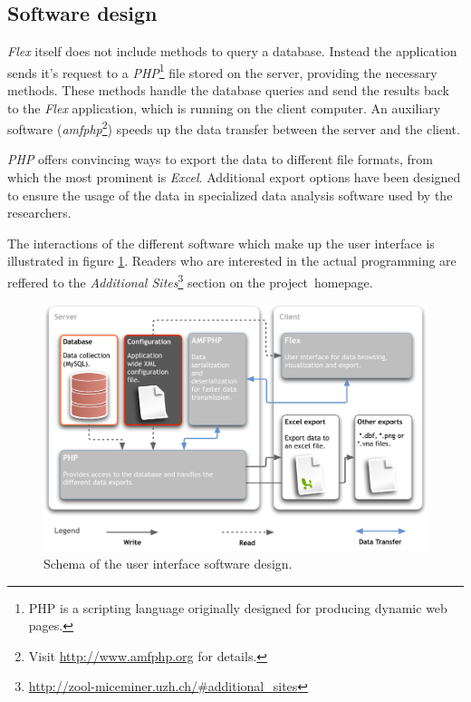 \subsection{Software design}
\label{subsec:miceminer_design}   

\textit{Flex} itself does not include methods to query a database. Instead the application sends it's request to a \textit{PHP}\footnote{PHP is a scripting language originally designed for producing dynamic web pages\cite{wiki:php}.} file stored on the server, providing the necessary methods. These methods handle the database queries and send the results back to the \textit{Flex} application, which is running on the client computer. An auxiliary software (\textit{amfphp}\footnote{Visit \href{http://www.amfphp.org}{http://www.amfphp.org} for details.}) speeds up the data transfer between the server and the client.

\textit{PHP} offers convincing ways to export the data to different file formats, from which the most prominent is \textit{Excel}. Additional export options have been designed to ensure the usage of the data in specialized data analysis software used by the researchers.

The interactions of the different software which make up the user interface is illustrated in figure \ref{fig:app_design_miceminer}. Readers who are interested in the actual programming are reffered to the \textit{Additional Sites}\footnote{\href{http://zool-miceminer.uzh.ch/\#additional_sites}{http://zool-miceminer.uzh.ch/\#additional\_sites}} section on the project~homepage.   

\begin{figure}[htpb]
\begin{center}
  \includegraphics[width=\textwidth]{assets/pdf/application_design_miceminer.pdf}
  \caption{Schema of the user interface software design.}
  \label{fig:app_design_miceminer}
\end{center}
\end{figure}

